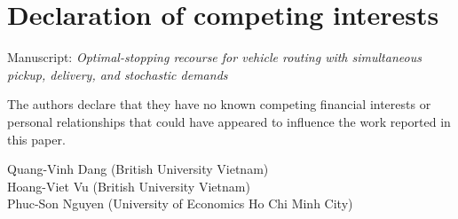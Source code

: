 \documentclass[11pt]{article}
\begin{document}
\section*{Declaration of competing interests}

Manuscript: \emph{Optimal-stopping recourse for vehicle routing
with simultaneous pickup, delivery, and stochastic demands}

The authors declare that they have no known competing financial
interests or personal relationships that could have appeared to
influence the work reported in this paper.

\vspace{16pt}
Quang-Vinh Dang (British University Vietnam)\\[4pt]
Hoang-Viet Vu (British University Vietnam)\\[4pt]
Phuc-Son Nguyen (University of Economics Ho Chi Minh City)
\end{document}
